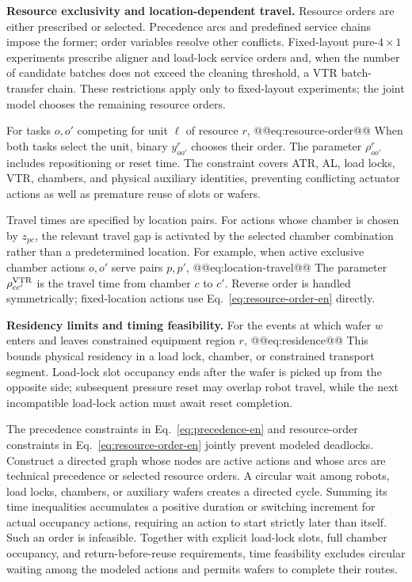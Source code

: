 \noindent\textbf{Resource exclusivity and location-dependent travel.}
Resource orders are either prescribed or selected. Precedence arcs and predefined service chains impose the former; order variables resolve other conflicts. Fixed-layout pure-$4\times1$ experiments prescribe aligner and load-lock service orders and, when the number of candidate batches does not exceed the cleaning threshold, a VTR batch-transfer chain. These restrictions apply only to fixed-layout experiments; the joint model chooses the remaining resource orders.

For tasks $o,o'$ competing for unit $\ell$ of resource $r$,
@@eq:resource-order@@
When both tasks select the unit, binary $y^r_{oo'}$ chooses their order. The parameter $\rho^r_{oo'}$ includes repositioning or reset time. The constraint covers ATR, AL, load locks, VTR, chambers, and physical auxiliary identities, preventing conflicting actuator actions as well as premature reuse of slots or wafers.

Travel times are specified by location pairs. For actions whose chamber is chosen by $z_{pc}$, the relevant travel gap is activated by the selected chamber combination rather than a predetermined location. For example, when active exclusive chamber actions $o,o'$ serve pairs $p,p'$,
@@eq:location-travel@@
The parameter $\rho^{\rm VTR}_{cc'}$ is the travel time from chamber $c$ to $c'$. Reverse order is handled symmetrically; fixed-location actions use Eq.~\eqref{eq:resource-order-en} directly.

\noindent\textbf{Residency limits and timing feasibility.}
For the events at which wafer $w$ enters and leaves constrained equipment region $r$,
@@eq:residence@@
This bounds physical residency in a load lock, chamber, or constrained transport segment. Load-lock slot occupancy ends after the wafer is picked up from the opposite side; subsequent pressure reset may overlap robot travel, while the next incompatible load-lock action must await reset completion.

The precedence constraints in Eq.~\eqref{eq:precedence-en} and resource-order constraints in Eq.~\eqref{eq:resource-order-en} jointly prevent modeled deadlocks. Construct a directed graph whose nodes are active actions and whose arcs are technical precedence or selected resource orders. A circular wait among robots, load locks, chambers, or auxiliary wafers creates a directed cycle. Summing its time inequalities accumulates a positive duration or switching increment for actual occupancy actions, requiring an action to start strictly later than itself. Such an order is infeasible. Together with explicit load-lock slots, full chamber occupancy, and return-before-reuse requirements, time feasibility excludes circular waiting among the modeled actions and permits wafers to complete their routes.


